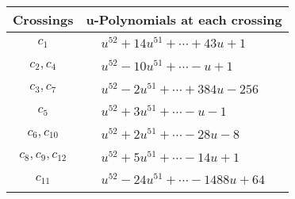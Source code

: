 \documentclass[1p]{elsarticle_modified}
\theoremstyle{definition}
\begin{document}
\begin{tabular}{m{50pt}|m{274pt}}
Crossings & \hspace{64pt}u-Polynomials at each crossing \\
\hline $$\begin{aligned}c_{1}\end{aligned}$$&$\begin{aligned}
&u^{52}+14 u^{51}+\cdots+43 u+1
\end{aligned}$\\
\hline $$\begin{aligned}c_{2},c_{4}\end{aligned}$$&$\begin{aligned}
&u^{52}-10 u^{51}+\cdots- u+1
\end{aligned}$\\
\hline $$\begin{aligned}c_{3},c_{7}\end{aligned}$$&$\begin{aligned}
&u^{52}-2 u^{51}+\cdots+384 u-256
\end{aligned}$\\
\hline $$\begin{aligned}c_{5}\end{aligned}$$&$\begin{aligned}
&u^{52}+3 u^{51}+\cdots- u-1
\end{aligned}$\\
\hline $$\begin{aligned}c_{6},c_{10}\end{aligned}$$&$\begin{aligned}
&u^{52}+2 u^{51}+\cdots-28 u-8
\end{aligned}$\\
\hline $$\begin{aligned}c_{8},c_{9},c_{12}\end{aligned}$$&$\begin{aligned}
&u^{52}+5 u^{51}+\cdots-14 u+1
\end{aligned}$\\
\hline $$\begin{aligned}c_{11}\end{aligned}$$&$\begin{aligned}
&u^{52}-24 u^{51}+\cdots-1488 u+64
\end{aligned}$\\
\hline
\end{tabular}\\~\\
\newpage\renewcommand{\arraystretch}{1}
\end{document}
